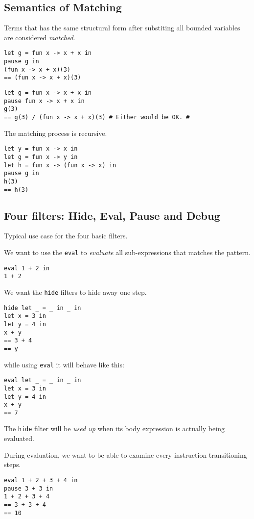 \subsection{Semantics of Matching}

Terms that has the same structural form after substiting all bounded variables are considered \emph{matched}.

\begin{verbatim}
let g = fun x -> x + x in
pause g in
(fun x -> x + x)(3)
== (fun x -> x + x)(3)
\end{verbatim}

\begin{verbatim}
let g = fun x -> x + x in
pause fun x -> x + x in
g(3)
== g(3) / (fun x -> x + x)(3) # Either would be OK. #
\end{verbatim}

The matching process is recursive.

\begin{verbatim}
let y = fun x -> x in
let g = fun x -> y in
let h = fun x -> (fun x -> x) in
pause g in
h(3)
== h(3)
\end{verbatim}

\subsection{Four filters: Hide, Eval, Pause and Debug}

Typical use case for the four basic filters.

We want to use the \verb|eval| to \emph{evaluate} all sub-expressions that matches the pattern.
\begin{verbatim}
eval 1 + 2 in
1 + 2
\end{verbatim}

We want the \verb|hide| filters to hide away one step.
\begin{verbatim}
hide let _ = _ in _ in
let x = 3 in
let y = 4 in
x + y
== 3 + 4
== y
\end{verbatim}
while using \verb|eval| it will behave like this:
\begin{verbatim}
eval let _ = _ in _ in
let x = 3 in
let y = 4 in
x + y
== 7
\end{verbatim}

The \verb|hide| filter will be \emph{used up} when its body expression
is actually being evaluated.

During evaluation, we want to be able to examine every instruction
transitioning steps.

\begin{verbatim}
eval 1 + 2 + 3 + 4 in
pause 3 + 3 in
1 + 2 + 3 + 4
== 3 + 3 + 4
== 10
\end{verbatim}

